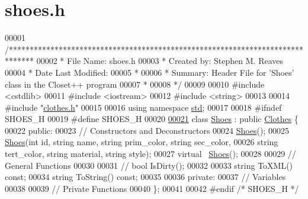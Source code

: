 \hypertarget{shoes_8h_source}{}\section{shoes.\+h}

\begin{DoxyCode}
00001 \textcolor{comment}{/******************************************************************************}
00002 \textcolor{comment}{ * File Name: shoes.h}
00003 \textcolor{comment}{ * Created by: Stephen M. Reaves}
00004 \textcolor{comment}{ * Date Last Modified:}
00005 \textcolor{comment}{ *}
00006 \textcolor{comment}{ * Summary: Header File for 'Shoes' class in the Closet++ program}
00007 \textcolor{comment}{ *}
00008 \textcolor{comment}{ */}
00009 
00010 \textcolor{preprocessor}{#include <cstdlib>}
00011 \textcolor{preprocessor}{#include <iostream>}
00012 \textcolor{preprocessor}{#include <string>}
00013 
00014 \textcolor{preprocessor}{#include "\mbox{\hyperlink{clothes_8h}{clothes.h}}"}
00015 
00016 \textcolor{keyword}{using namespace }\mbox{\hyperlink{namespacestd}{std}};
00017 
00018 \textcolor{preprocessor}{#ifndef SHOES\_H}
00019 \textcolor{preprocessor}{#define SHOES\_H}
00020 
\mbox{\hyperlink{classShoes}{00021}} \textcolor{keyword}{class }\mbox{\hyperlink{classShoes}{Shoes}} : \textcolor{keyword}{public} \mbox{\hyperlink{classClothes}{Clothes}} \{
00022  \textcolor{keyword}{public}:
00023   \textcolor{comment}{// Constructors and Deconstructors}
00024   \mbox{\hyperlink{classShoes}{Shoes}}();
00025   \mbox{\hyperlink{classShoes}{Shoes}}(\textcolor{keywordtype}{int} \textcolor{keywordtype}{id}, \textcolor{keywordtype}{string} name, \textcolor{keywordtype}{string} prim\_color, \textcolor{keywordtype}{string} sec\_color,
00026         \textcolor{keywordtype}{string} tert\_color, \textcolor{keywordtype}{string} material, \textcolor{keywordtype}{string} style);
00027   \textcolor{keyword}{virtual} ~\mbox{\hyperlink{classShoes}{Shoes}}();
00028 
00029   \textcolor{comment}{// General Functions}
00030 
00031   \textcolor{comment}{// bool IsDirty();}
00032 
00033   \textcolor{keywordtype}{string} ToXML() \textcolor{keyword}{const};
00034   \textcolor{keywordtype}{string} ToString() \textcolor{keyword}{const};
00035 
00036  \textcolor{keyword}{private}:
00037   \textcolor{comment}{// Variables}
00038 
00039   \textcolor{comment}{// Private Functions}
00040 \};
00041 
00042 \textcolor{preprocessor}{#endif }\textcolor{comment}{/* SHOES\_H */}\textcolor{preprocessor}{}
\end{DoxyCode}
